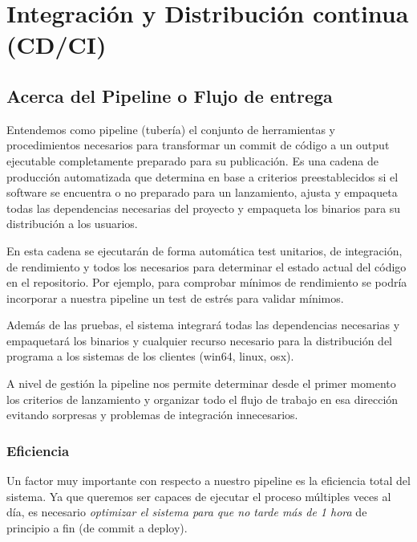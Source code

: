 
\section{Integración y Distribución continua (CD/CI)}\label{pipeline:entrega-continua}

\subsection{Acerca del Pipeline o Flujo de entrega}

Entendemos como pipeline (tubería) el conjunto de herramientas y procedimientos
necesarios para transformar un commit de código a un output ejecutable
completamente preparado para su publicación. Es una cadena de producción
automatizada que determina en base a criterios preestablecidos si el software
se encuentra o no preparado para un lanzamiento, ajusta y empaqueta todas las
dependencias necesarias del proyecto y empaqueta los binarios para su
distribución a los usuarios.

En esta cadena se ejecutarán de forma automática test unitarios, de
integración, de rendimiento y todos los necesarios para determinar el estado
actual del código en el repositorio. Por ejemplo, para comprobar mínimos de
rendimiento se podría incorporar a nuestra pipeline un test de estrés para
validar  mínimos.

Además de las pruebas, el sistema integrará todas las dependencias necesarias y
empaquetará los binarios y cualquier recurso necesario para la distribución del
programa a los sistemas de los clientes (win64, linux, osx).

A nivel de gestión la pipeline nos permite determinar desde el primer momento
los criterios de lanzamiento y organizar todo el flujo de trabajo en esa
dirección evitando sorpresas y problemas de integración innecesarios.

\subsubsection{Eficiencia}\label{pipeline:eficiencia}

Un factor muy importante con respecto a nuestro pipeline es la eficiencia total
del sistema. Ya que queremos ser capaces de ejecutar el proceso múltiples veces
al día, es necesario \emph{optimizar el sistema para que no tarde más de 1
hora} de principio a fin (de commit a deploy).

